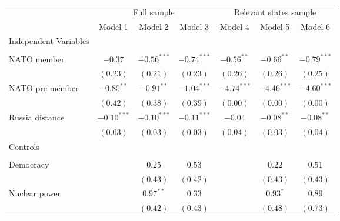 
\begin{table}[h]
\begin{center}
\begin{tabular}{l c c c c c c}
\hline
 & \multicolumn{3}{c}{Full sample} & \multicolumn{3}{c}{Relevant states sample} \\
\cline{2-4} \cline{5-7}
 & Model 1 & Model 2 & Model 3 & Model 4 & Model 5 & Model 6 \\
\hline
Independent Variables &               &               &               &               &               &               \\
                      &               &               &               &               &               &               \\
\quad NATO member     & $-0.37$       & $-0.56^{***}$ & $-0.74^{***}$ & $-0.56^{**}$  & $-0.66^{**}$  & $-0.79^{***}$ \\
                      & $(0.23)$      & $(0.21)$      & $(0.23)$      & $(0.26)$      & $(0.26)$      & $(0.25)$      \\
\quad NATO pre-member & $-0.85^{**}$  & $-0.91^{**}$  & $-1.04^{***}$ & $-4.74^{***}$ & $-4.46^{***}$ & $-4.60^{***}$ \\
                      & $(0.42)$      & $(0.38)$      & $(0.39)$      & $(0.00)$      & $(0.00)$      & $(0.00)$      \\
\quad Russia distance & $-0.10^{***}$ & $-0.10^{***}$ & $-0.11^{***}$ & $-0.04$       & $-0.08^{**}$  & $-0.08^{**}$  \\
                      & $(0.03)$      & $(0.03)$      & $(0.03)$      & $(0.04)$      & $(0.03)$      & $(0.04)$      \\
Controls              &               &               &               &               &               &               \\
                      &               &               &               &               &               &               \\
\quad Democracy       &               & $0.25$        & $0.53$        &               & $0.22$        & $0.51$        \\
                      &               & $(0.43)$      & $(0.42)$      &               & $(0.43)$      & $(0.43)$      \\
\quad Nuclear power   &               & $0.97^{**}$   & $0.33$        &               & $0.93^{*}$    & $0.89$        \\
                      &               & $(0.42)$      & $(0.43)$      &               & $(0.48)$      & $(0.73)$      \\

\end{tabular}
\end{center}
\end{table}
